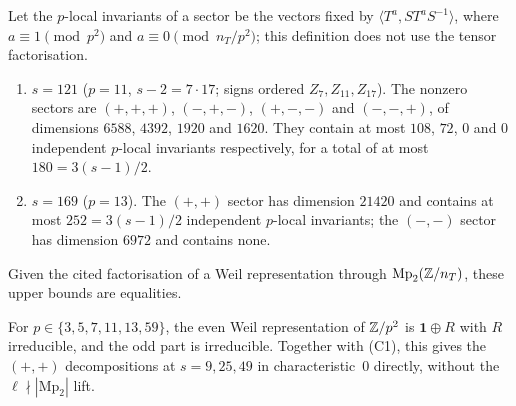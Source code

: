 \begin{proposition}[Label-space counts at $s=121$ and $s=169$]\label{prop:s121}
Let the $p$-local invariants of a sector be the vectors fixed by $\langle T^a,ST^aS^{-1}\rangle$, where $a\equiv1\pmod{p^2}$ and $a\equiv0\pmod{n_T/p^2}$; this definition does not use the tensor factorisation.
\begin{enumerate}[label=(\roman*)]
\item $s=121$ ($p=11$, $s-2=7\cdot17$; signs ordered $Z_7,Z_{11},Z_{17}$). The nonzero sectors are $(+,+,+)$, $(-,+,-)$, $(+,-,-)$ and $(-,-,+)$, of dimensions $6588$, $4392$, $1920$ and $1620$. They contain at most $108$, $72$, $0$ and $0$ independent $p$-local invariants respectively, for a total of at most $180=3(s-1)/2$.
\item $s=169$ ($p=13$). The $(+,+)$ sector has dimension $21420$ and contains at most $252=3(s-1)/2$ independent $p$-local invariants; the $(-,-)$ sector has dimension $6972$ and contains none.
\end{enumerate}
Given the cited factorisation of a Weil representation through $\mathrm{Mp}_2(\mathbb{Z}/n_T)$, these upper bounds are equalities.
\end{proposition}
\begin{proposition}\label{prop:c3small6}
For $p\in\{3,5,7,11,13,59\}$, the even Weil representation of $\mathbb{Z}/p^2$ is $\mathbf 1\oplus R$ with $R$ irreducible, and the odd part is irreducible. Together with (C1), this gives the $(+,+)$ decompositions at $s=9,25,49$ in characteristic~$0$ directly, without the $\ell\nmid|\mathrm{Mp}_2|$ lift.
\end{proposition}

